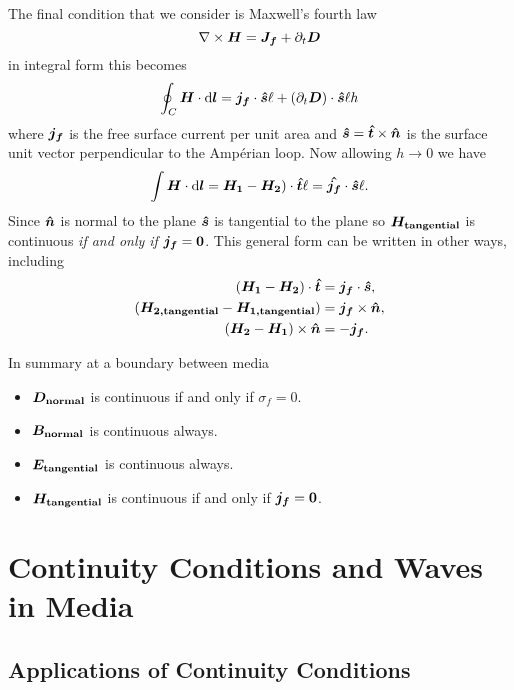     The final condition that we consider is Maxwell's fourth law
    \[\nabla\times\bm{H} = \bm{J_f} + \partial_t\bm{D}\]
    in integral form this becomes
    \[\oint_{C}\bm{H}\cdot\dd{\bm{l}} = \bm{j_f} \cdot \bm{\hat{s}}\ell + (\partial_t\bm{D})\cdot\bm{\hat{s}}\ell h\]
    where \(\bm{j_f}\) is the free surface current per unit area and \(\bm{\hat{s}} = \bm{\hat{t}}\times\bm{\hat{n}}\) is the surface unit vector perpendicular to the Amp\'erian loop.
    Now allowing \(h\to 0\) we have
    \[\int\bm{H}\cdot\dd{\bm{l}} = \bm{H_1} - \bm{H_2})\cdot\bm{\hat{t}}\ell = \bm{\hat{j_f}}\cdot\bm{\hat{s}}\ell.\]
    Since \(\bm{\hat{n}}\) is normal to the plane \(\bm{\hat{s}}\) is tangential to the plane so \(\bm{H_\mathrm{tangential}}\) is continuous \emph{if and only if} \(\bm{j_f} = \bm{0}\).
    This general form can be written in other ways, including
    \begin{align*}
        (\bm{H_1} - \bm{H_2})\cdot\bm{\hat{t}} &= \bm{j_f}\cdot\bm{\hat{s}},\\
        (\bm{H_{2, \mathrm{tangential}}} - \bm{H_{1, \mathrm{tangential}}}) &= \bm{j_f}\times\bm{\hat{n}},\\
        (\bm{H_2} - \bm{H_1})\times\bm{\hat{n}} &= -\bm{j_f}.
    \end{align*}

    In summary at a boundary between media
    \begin{itemize}
        \item \(\bm{D_{\mathrm{normal}}}\) is continuous if and only if \(\sigma_f = 0\).
        \item \(\bm{B_{\mathrm{normal}}}\) is continuous always.
        \item \(\bm{E_{\mathrm{tangential}}}\) is continuous always.
        \item \(\bm{H_{\mathrm{tangential}}}\) is continuous if and only if \(\bm{j_f} = \bm{0}\).
    \end{itemize}

    \section{Continuity Conditions and Waves in Media}
    \subsection{Applications of Continuity Conditions}
